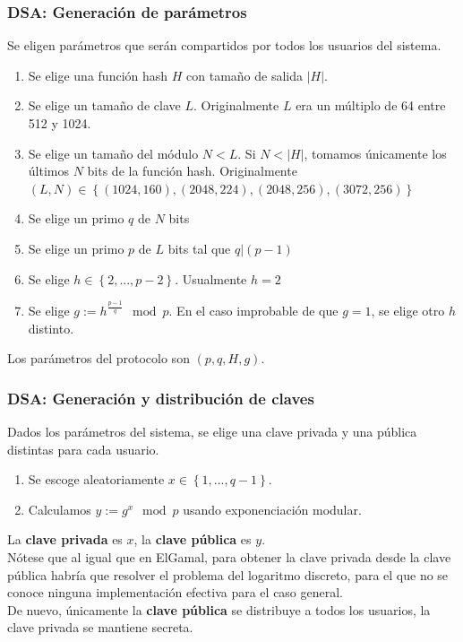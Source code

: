 \documentclass{beamer}
\begin{document}
\begin{frame}
    \frametitle{DSA: Generación de parámetros}

    Se eligen parámetros que serán compartidos por todos los usuarios del sistema.

    \begin{enumerate}
        \item Se elige una función hash $H$ con tamaño de salida $|H|$.
        \item Se elige un tamaño de clave $L$. Originalmente $L$ era un múltiplo de 64 entre 512 y 1024.
        \item Se elige un tamaño del módulo $N < L$. Si $N < |H|$, tomamos únicamente los últimos $N$ bits de la función hash. Originalmente $(L, N) \in \left\{ (1024, 160), (2048, 224), (2048, 256), (3072, 256) \right\}$ 
        \item Se elige un primo $q$ de $N$ bits
        \item Se elige un primo $p$ de $L$ bits tal que $q \vert \left(p-1\right)$
        \item Se elige $h \in \left\{2, ..., p-2\right\}$. Usualmente $h = 2$ 
        \item Se elige $g := h^{\frac{p-1}{q}} \mod p$. En el caso improbable de que $g=1$, se elige otro $h$ distinto.
    \end{enumerate}

    Los parámetros del protocolo son $(p, q, H, g)$.
\end{frame}

\begin{frame}
    \frametitle{DSA: Generación y distribución de claves}

    Dados los parámetros del sistema, se elige una clave privada y una pública distintas para cada usuario.

    \begin{enumerate}
        \item Se escoge aleatoriamente $x \in \left\{1, ..., q-1\right\}$.
        \item Calculamos $y := g^x \mod p$ usando exponenciación modular.
    \end{enumerate}

    La \textbf{clave privada} es $x$, la \textbf{clave pública} es $y$.
    \\[10pt]
    Nótese que al igual que en ElGamal, para obtener la clave privada desde la clave pública habría que resolver el problema del \alert{logaritmo discreto}, para el que no se conoce ninguna implementación efectiva para el caso general.
    \\[10pt]
    De nuevo, únicamente la \textbf{clave pública} se distribuye a todos los usuarios, la clave privada se mantiene secreta.
\end{frame}
\end{document}

